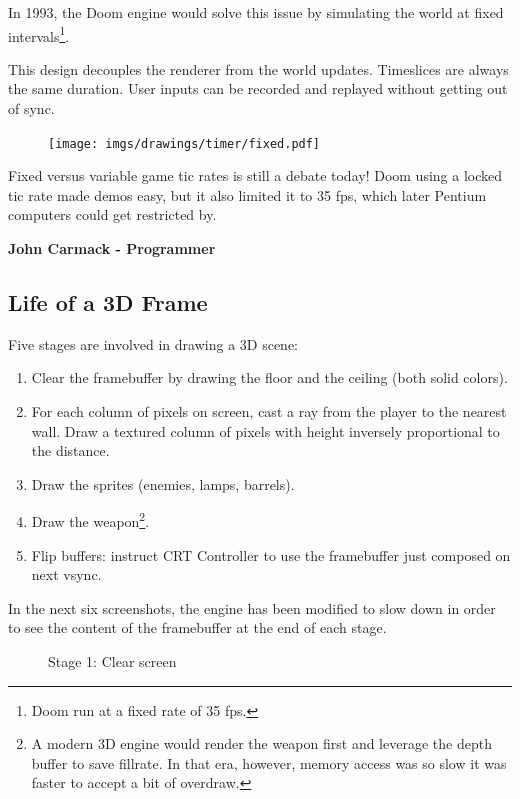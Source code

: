 \par
In 1993, the Doom engine would solve this issue by simulating the world at fixed intervals\footnote{Doom run at a fixed rate of 35 fps.}.\\
\par
\begin{minipage}{\textwidth}
 
 \end{minipage}
\par
This design decouples the renderer from the world updates. Timeslices are always the same duration. User inputs can be recorded and replayed without getting out of sync.
\par
 \begin{figure}[H]
\centering
 \texttt{[image: imgs/drawings/timer/fixed.pdf]}
 \end{figure}

\begin{fancyquotes}
 Fixed versus variable game tic rates is still a debate today!  Doom using a locked tic rate made demos easy, but it also limited it to 35 fps, which later Pentium computers could get restricted by.\\
\par
\textbf{John Carmack - Programmer}
 \end{fancyquotes}










\subsection{Life of a 3D Frame}
Five stages are involved in drawing a 3D scene:\\
\begin{enumerate}
 \item Clear the framebuffer by drawing the floor and the ceiling (both solid colors).
 \item For each column of pixels on screen, cast a ray from the player to the nearest wall. Draw a textured column of pixels with height inversely proportional to the distance.
 \item Draw the sprites (enemies, lamps, barrels).
 \item Draw the weapon\footnote{A modern 3D engine would render the weapon first and leverage the depth buffer to save fillrate. In that era, however, memory access was so slow it was faster to accept a bit of overdraw.}.	
 \item Flip buffers: instruct CRT Controller to use the framebuffer just composed on next vsync.
\end{enumerate}
In the next six screenshots, the engine has been modified to slow down in order to see the content of the framebuffer at the end of each stage.\\
\begin{figure}[H]
\centering
 \caption{Stage 1: Clear screen}
 \end{figure}





